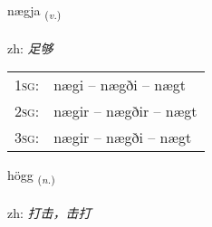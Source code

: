 \documentclass[frontgrid, backgrid]{flacards}\usepackage[]{graphicx}\usepackage[]{color}
\begin{document}
\renewcommand{\flhead}{\vskip5pt \fboxsep=0pt {\small\bfseries\footnotesize Sagnorð | 动词}}
\renewcommand{\fcfoot}{\vskip5pt \fboxsep=0pt \hspace{2pt}{\small\bfseries\footnotesize 2K}}

\renewcommand{\blhead}{\vskip5pt {\small\bfseries\footnotesize Sagnorð | 动词 }}
\renewcommand{\bcfoot}{\vskip5pt \hspace{2pt}{\small\bfseries\footnotesize 2K}}


{nægja \small{\textsubscript{(\textit{v.})}} \\[1ex] %
\textphonetic{[naiːja]} \\
zh: \emph{足够} \\  [2ex]
\renewcommand*{\arraystretch}{0.8}
\begin{tabular}{p{1cm}l}
\textsc{1sg}: & nægi -- nægði -- nægt \\ 
\textsc{2sg}: & nægir -- nægðir -- nægt \\ 
\textsc{3sg}: & nægir -- nægði -- nægt \\ 
\end{tabular}
}

\renewcommand{\flhead}{\vskip5pt \fboxsep=0pt {\small\bfseries\footnotesize Nafnorð | 名词}}
\renewcommand{\fcfoot}{\vskip5pt \fboxsep=0pt \hspace{2pt}{\small\bfseries\footnotesize 2K}}

\renewcommand{\blhead}{\vskip5pt {\small\bfseries\footnotesize Nafnorð | 名词 }}
\renewcommand{\bcfoot}{\vskip5pt \hspace{2pt}{\small\bfseries\footnotesize 2K}}


{högg \small{\textsubscript{(\textit{n.})}} \\[1ex] %
\textphonetic{[hœk]} \\
zh: \emph{打击，击打} \\  [2ex]
\renewcommand*{\arraystretch}{0.8}
}
\end{document}

